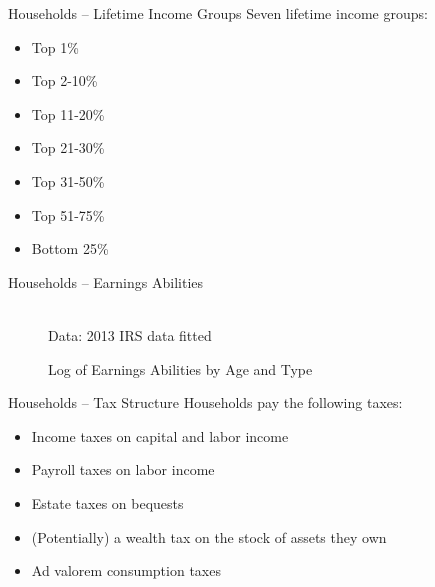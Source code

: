 \documentclass{beamer}
\begin{document}
  \begin{frame}{Households -- Lifetime Income Groups}
      Seven lifetime income groups:
      \begin{itemize}
      \item Top 1\%
      \item Top 2-10\%
      \item Top 11-20\%
      \item Top 21-30\%
      \item Top 31-50\%
      \item Top 51-75\%
      \item Bottom 25\%
      \end{itemize}
  \end{frame}

  \begin{frame}{Households -- Earnings Abilities}
      \begin{figure}[htb]\centering
         \caption{Log of Earnings Abilities by Age and Type}
          \\
         \tiny{Data: 2013 IRS data fitted}
      \end{figure}
  \end{frame}

  \begin{frame}{Households -- Tax Structure}
    Households pay the following taxes:
    \begin{itemize}
    \item Income taxes on capital and labor income
    \item Payroll taxes on labor income
    \item Estate taxes on bequests
    \item (Potentially) a wealth tax on the stock of assets they own
    \item Ad valorem consumption taxes
    \end{itemize}
  \end{frame}
\end{document}
